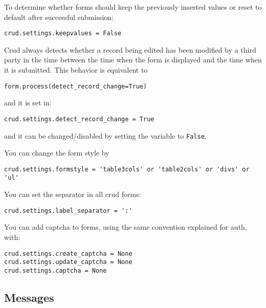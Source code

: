 \documentclass[justified,sixbynine,notoc]{tufte-book}
\def\ft{\small\tt}
\begin{document}
\begin{fullwidth}
To determine whether forms should keep the previously inserted values or reset to default after successful submission:

\begin{lstlisting}
crud.settings.keepvalues = False
\end{lstlisting}

Crud always detects whether a record being edited has been modified by a third party in the time between the time when the form is displayed and the time when it is submitted. This behavior is equivalent to
\begin{lstlisting}
form.process(detect_record_change=True)
\end{lstlisting}
\noindent and it is set in:

\begin{lstlisting}
crud.settings.detect_record_change = True
\end{lstlisting}
and it can be changed/disabled by setting the variable to {\ft False}.

You can change the form style by

\begin{lstlisting}
crud.settings.formstyle = 'table3cols' or 'table2cols' or 'divs' or 'ul'
\end{lstlisting}

You can set the separator in all crud forms:

\begin{lstlisting}
crud.settings.label_separator = ':'
\end{lstlisting}

You can add captcha to forms, using the same convention explained for auth, with:

\begin{lstlisting}
crud.settings.create_captcha = None
crud.settings.update_captcha = None
crud.settings.captcha = None
\end{lstlisting}

\goodbreak\subsection{Messages}


\end{fullwidth}
\end{document}
